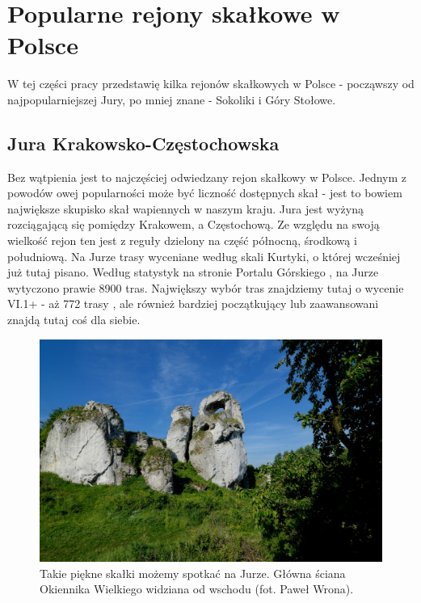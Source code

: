 \documentclass{article}
\begin{document}
\section{Popularne rejony skałkowe w Polsce}
\lettrine[lines=2]{W}{} tej części pracy przedstawię kilka rejonów skałkowych w Polsce - począwszy od najpopularniejszej Jury, po mniej znane - Sokoliki i Góry Stołowe.

\subsection{Jura Krakowsko-Częstochowska}
Bez wątpienia jest to najczęściej odwiedzany rejon skałkowy w Polsce. Jednym z powodów owej popularności może być liczność dostępnych skał - jest to bowiem największe skupisko skał wapiennych w naszym kraju. Jura jest wyżyną rozciągającą się pomiędzy Krakowem, a Częstochową. Ze względu na swoją wielkość rejon ten jest z reguły dzielony na część północną, środkową i południową. Na Jurze trasy wyceniane według skali Kurtyki, o której wcześniej już tutaj pisano. Według statystyk na stronie Portalu Górskiego \cite{topo-jura}, na Jurze wytyczono prawie 8900 tras. Największy wybór tras znajdziemy tutaj o wycenie VI.1+ - aż 772 trasy \cite{topo-jura}, ale również bardziej początkujący lub zaawansowani znajdą tutaj coś dla siebie.

\begin{figure}[!htbp]
	\begin{center}
		\includegraphics[width=0.9\linewidth]{images/jura-okiennik.eps}
	\end{center}
	\caption{Takie piękne skałki możemy spotkać na Jurze. Główna ściana Okiennika Wielkiego widziana od wschodu (fot. Paweł Wrona)\cite{jura-okiennik}.}
	\label{}
\end{figure}
\end{document}
